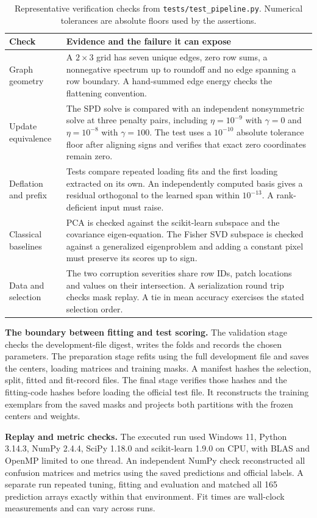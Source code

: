 \begin{table}[H]\small
\caption{Representative verification checks from \texttt{tests/test\_pipeline.py}. Numerical tolerances are absolute floors used by the assertions.}
\label{tab:checks}
\begin{tabularx}{\linewidth}{@{}P{33mm}Y@{}}
\toprule
Check & Evidence and the failure it can expose\\
\midrule
Graph geometry & A $2\times3$ grid has seven unique edges, zero row sums, a nonnegative spectrum up to roundoff and no edge spanning a row boundary. A hand-summed edge energy checks the flattening convention.\\
Update equivalence & The SPD solve is compared with an independent nonsymmetric solve at three penalty pairs, including $\eta=10^{-9}$ with $\gamma=0$ and $\eta=10^{-8}$ with $\gamma=100$. The test uses a $10^{-10}$ absolute tolerance floor after aligning signs and verifies that exact zero coordinates remain zero.\\
Deflation and prefix & Tests compare repeated loading fits and the first loading extracted on its own. An independently computed basis gives a residual orthogonal to the learned span within $10^{-13}$. A rank-deficient input must raise.\\
Classical baselines & PCA is checked against the scikit-learn subspace and the covariance eigen-equation. The Fisher SVD subspace is checked against a generalized eigenproblem and adding a constant pixel must preserve its scores up to sign.\\
Data and selection & The two corruption severities share row IDs, patch locations and values on their intersection. A serialization round trip checks mask replay. A tie in mean accuracy exercises the stated selection order.\\
\bottomrule
\end{tabularx}
\end{table}

\textbf{The boundary between fitting and test scoring.}
The validation stage checks the development-file digest, writes the folds and records the chosen parameters. The preparation stage refits using the full development file and saves the centers, loading matrices and training masks. A manifest hashes the selection, split, fitted and fit-record files. The final stage verifies those hashes and the fitting-code hashes before loading the official test file. It reconstructs the training exemplars from the saved masks and projects both partitions with the frozen centers and weights.

\textbf{Replay and metric checks.}
The executed run used Windows 11, Python 3.14.3, NumPy 2.4.4, SciPy 1.18.0 and scikit-learn 1.9.0 on CPU, with BLAS and OpenMP limited to one thread. An independent NumPy check reconstructed all confusion matrices and metrics using the saved predictions and official labels. A separate run repeated tuning, fitting and evaluation and matched all 165 prediction arrays exactly within that environment. Fit times are wall-clock measurements and can vary across runs.
